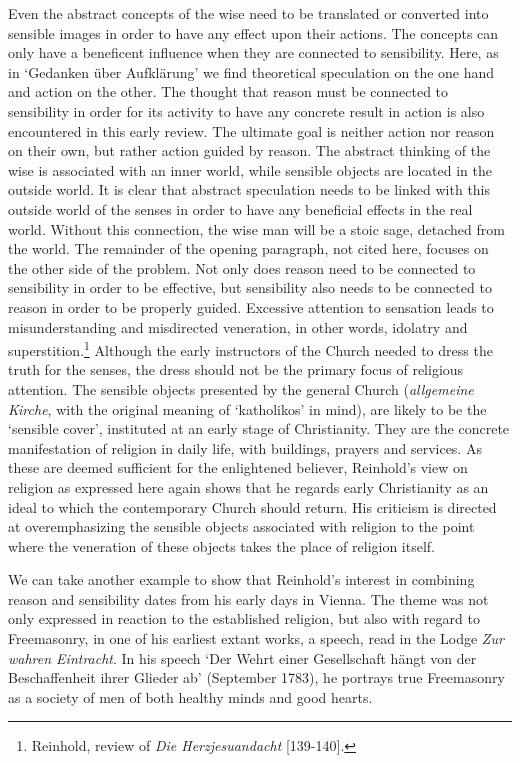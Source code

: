Even the abstract concepts of the wise need to be translated or converted into sensible images in order to have any effect upon their actions. The concepts can only have a beneficent influence when they are connected to sensibility. Here, as in `Gedanken \"{u}ber Aufkl\"{a}rung' we find theoretical speculation on the one hand and action on the other. The thought that reason must be connected to sensibility in order for its activity to have any concrete result in action is also encountered in this early review. The ultimate goal is neither action nor reason on their own, but rather action guided by reason. The abstract thinking of the wise is associated with an inner world, while sensible objects are located in the outside world. It is clear that abstract speculation needs to be linked with this outside world of the senses in order to have any beneficial effects in the real world. Without this connection, the wise man will be a stoic sage, detached from the world. The remainder of the opening paragraph, not cited here, focuses on the other side of the problem. Not only does reason need to be connected to sensibility in order to be effective, but sensibility also needs to be connected to reason in order to be properly guided. Excessive attention to sensation leads to misunderstanding and misdirected veneration, in other words, idolatry and superstition.\footnote{ Reinhold, review of \textit{Die Herzjesuandacht }[139{-}140].} Although the early instructors of the Church needed to dress the truth for the senses, the dress should not be the primary focus of religious attention. The sensible objects presented by the general Church (\textit{allgemeine} \textit{Kirche}, with the original meaning of `katholikos' in mind), are likely to be the `sensible cover', instituted at an early stage of Christianity. They are the concrete manifestation of religion in daily life, with buildings, prayers and services. As these are deemed sufficient for the enlightened believer, Reinhold's view on religion as expressed here again shows that he regards early Christianity as an ideal to which the contemporary Church should return. His criticism is directed at overemphasizing the sensible objects associated with religion to the point where the veneration of these objects takes the place of religion itself. 

 We can take another example to show that Reinhold's interest in combining reason and sensibility dates from his early days in Vienna. The theme was not only expressed in reaction to the established religion, but also with regard to Freemasonry, in one of his earliest extant works, a speech, read in the Lodge \textit{Zur wahren Eintracht}. In his speech `Der Wehrt einer Gesellschaft h\"{a}ngt von der Beschaffenheit ihrer Glieder ab' (September 1783), he portrays true Freemasonry as a society of men of both healthy minds and good hearts. 

